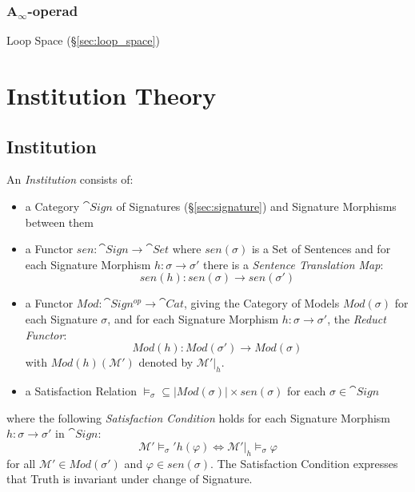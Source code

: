 \subsubsection{A$_\infty$-operad}\label{sec:a_infinity_operad}

Loop Space (\S\ref{sec:loop_space})



\section{Institution Theory}\label{sec:institution_theory}

\subsection{Institution}\label{sec:institution}

An \emph{Institution} consists of:

\begin{itemize}
\item a Category $\cat{Sign}$ of Signatures (\S\ref{sec:signature})
  and Signature Morphisms between them
\item a Functor $sen : \cat{Sign} \rightarrow \cat{Set}$ where
  $sen(\sigma)$ is a Set of Sentences and for each Signature Morphism
  $h : \sigma \rightarrow \sigma'$ there is a \emph{Sentence
  Translation Map}:
  \[
  sen(h) : sen(\sigma) \rightarrow sen(\sigma')
  \]
\item a Functor $Mod : \cat{Sign^{op}} \rightarrow \cat{Cat}$,
  giving the Category of Models $Mod (\sigma)$ for each Signature
  $\sigma$, and for each Signature Morphism $h : \sigma \rightarrow
  \sigma'$, the \emph{Reduct Functor}:
  \[
  Mod(h) : Mod(\sigma') \rightarrow Mod(\sigma)
  \]
  with $Mod(h)(\mathcal{M}')$ denoted by $\mathcal{M}'|_h$.
\item a Satisfaction Relation $\models_\sigma \subseteq |Mod(\sigma)|
  \times sen(\sigma)$ for each $\sigma \in \cat{Sign}$
\end{itemize}
where the following \emph{Satisfaction Condition} holds for each
Signature Morphism $h : \sigma \rightarrow \sigma'$ in
$\cat{Sign}$:
\[
  \mathcal{M}' \models_\sigma' h(\varphi) \Leftrightarrow
  \mathcal{M}'|_h \models_\sigma \varphi
\]
for all $\mathcal{M}' \in Mod(\sigma')$ and $\varphi \in sen(\sigma)$.
The Satisfaction Condition expresses that Truth is invariant under
change of Signature.



